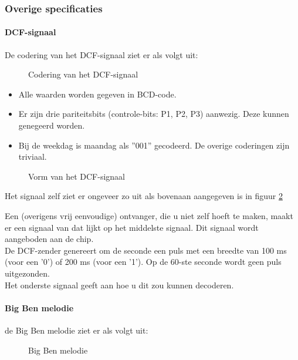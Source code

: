 \subsubsection{Overige specificaties}

\paragraph{DCF-signaal}

De codering van het DCF-signaal ziet er als volgt uit:

\begin{figure}[bth]
\centerline{}
\caption{Codering van het DCF-signaal}
\label{dcfcode}
\end{figure}

\begin{itemize}
\item
Alle waarden worden gegeven in BCD-code.
\item
Er zijn drie pariteitsbits (controle-bits: P1, P2, P3) aanwezig. Deze kunnen
genegeerd worden.
\item
Bij de weekdag is maandag als ''001'' gecodeerd. De overige coderingen zijn
triviaal.
\end{itemize}
\begin{figure}[bth]
\centerline{}
\caption{Vorm van het DCF-signaal}
\label{dcfsignaal}
\end{figure}


Het signaal zelf ziet er ongeveer zo uit als bovenaan aangegeven is in figuur
\ref{dcfsignaal}

Een (overigens vrij eenvoudige) ontvanger, die u niet zelf hoeft te maken, maakt
 er een signaal van dat lijkt op het middelste signaal. Dit signaal wordt
aangeboden aan de chip.\\
De DCF-zender genereert om de seconde een puls
met een breedte van 100 ms (voor een '0') of 200 ms (voor een '1').
Op de 60-ste seconde wordt geen puls uitgezonden.\\
Het onderste signaal geeft aan hoe u dit zou kunnen decoderen.

\paragraph{Big Ben melodie}

de Big Ben melodie ziet er als volgt uit:\\


\begin{figure}[bth]
\centerline{}
\caption{Big Ben melodie}
\label{Big_Ben}
\end{figure}


